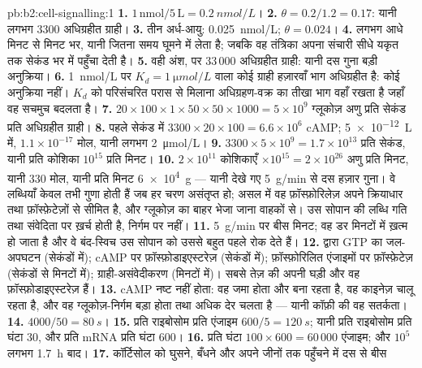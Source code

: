 \begin{solution}{pb:b2:cell-signalling:1}
\textbf{1.} $1\,\text{nmol}/5\,\text{L} = \qty{0.2}{nmol/L}$।
\textbf{2.} $\theta = 0.2/1.2 = 0.17$: यानी लगभग 3300 अधिग्रहीत ग्राही।
\textbf{3.} तीन अर्ध-आयु: \qty{0.025}{nmol/L}; $\theta = 0.024$।
\textbf{4.} लगभग आधे मिनट से मिनट भर, यानी जितना समय 
घूमने में लेता है; जबकि वह तंत्रिका अपना संचारी सीधे
यकृत तक सेकंड भर में पहुँचा देती है।
\textbf{5.} वही अंश, पर $33\,000$ अधिग्रहीत ग्राही: यानी
दस गुना बड़ी अनुक्रिया।
\textbf{6.} \qty{1}{nmol/L} पर $K_d = \qty{1}{\micro
mol/L}$ वाला कोई ग्राही हज़ारवाँ भाग अधिग्रहीत है: कोई अनुक्रिया नहीं। $K_d$ को
परिसंचरित परास से मिलाना अधिग्रहण-वक्र का तीखा भाग वहाँ रखता है जहाँ
वह  सचमुच बदलता है।
\textbf{7.} $20\times 100\times 1\times 50\times 50\times 1000 =
5\times 10^{9}$ ग्लूकोज़ अणु प्रति सेकंड प्रति अधिग्रहीत ग्राही।
\textbf{8.} पहले सेकंड में $3300\times 20\times 100 = 6.6\times 10^{6}$
cAMP; \qty{5e-12}{L} में, $1.1\times 10^{-17}$ मोल, यानी लगभग
\qty{2}{\micro mol/L}।
\textbf{9.} $3300\times 5\times 10^{9} = 1.7\times 10^{13}$ प्रति सेकंड, यानी प्रति कोशिका $10^{15}$
प्रति मिनट।
\textbf{10.} $2\times 10^{11}$ कोशिकाएँ $\times 10^{15} = 2\times
10^{26}$ अणु प्रति मिनट, यानी 330 मोल, यानी प्रति मिनट \qty{6e4}{g} --- यानी
देखे गए \qty{5}{g/min} से दस हज़ार गुना। वे लब्धियाँ केवल तभी गुणा होती हैं
जब हर चरण असंतृप्त हो; असल में वह फ़ॉस्फ़ोरिलेज़
अपने क्रियाधार तथा फ़ॉस्फ़ेटेज़ों से सीमित है, और ग्लूकोज़ का बाहर भेजा जाना
वाहकों से। उस सोपान की लब्धि गति तथा
संवेदिता पर ख़र्च होती है, निर्गम पर नहीं।
\textbf{11.} \qty{5}{g/min} पर बीस मिनट; वह डर मिनटों में ख़त्म हो जाता है
और वे बंद-स्विच उस सोपान को उससे बहुत पहले रोक देते हैं।
\textbf{12.}  द्वारा GTP का जल-अपघटन (सेकंडों में);
cAMP पर फ़ॉस्फ़ोडाइएस्टरेज़ (सेकंडों में); फ़ॉस्फ़ोरिलित एंजाइमों पर
फ़ॉस्फ़ेटेज़ (सेकंडों से मिनटों में);
ग्राही-असंवेदीकरण (मिनटों में)। सबसे तेज़  की अपनी घड़ी
और वह फ़ॉस्फ़ोडाइएस्टरेज़ हैं।
\textbf{13.} cAMP नष्ट नहीं होता: वह जमा होता और बना रहता है, वह
काइनेज़ चालू रहता है, और वह ग्लूकोज़-निर्गम बड़ा होता तथा अधिक देर चलता है
--- यानी कॉफ़ी की वह सतर्कता।
\textbf{14.} $4000/50 = \qty{80}{s}$।
\textbf{15.} प्रति राइबोसोम प्रति एंजाइम $600/5 = \qty{120}{s}$; यानी प्रति
राइबोसोम प्रति घंटा 30, और प्रति mRNA प्रति घंटा 600।
\textbf{16.} प्रति घंटा $100\times 600 = 60\,000$ एंजाइम; और $10^{5}$
लगभग \qty{1.7}{h} बाद।
\textbf{17.} कॉर्टिसोल को घुसने, बँधने और अपने जीनों तक पहुँचने में दस से बीस

\end{solution}
